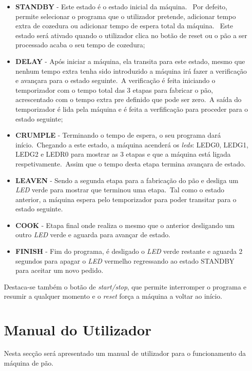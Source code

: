 \documentclass{article}
\begin{document}
    \begin{itemize}
        \label{finite-states}
        \item \textbf{STANDBY} - Este estado é o estado inicial da máquina. \ Por defeito, permite selecionar o programa que o utilizador pretende, adicionar tempo extra de cozedura ou adicionar tempo de espera total da máquina. \ Este estado será ativado quando o utilizador clica no botão de reset ou o pão a ser processado acaba o seu tempo de cozedura;
        \item \textbf{DELAY} - Após iniciar a máquina, ela transita para este estado, mesmo que nenhum tempo extra tenha sido introduzido a máquina irá fazer a verificação e avançara para o estado seguinte.\ A verificação é feita iniciando o temporizador com o tempo total das 3 etapas para fabricar o pão, acrescentado com o tempo extra pre definido que pode ser zero.\ A saída do temporizador é lida pela máquina e é feita a verfificação para proceder para o estado seguinte;
        \item \textbf{CRUMPLE} - Terminando o tempo de espera, o seu programa dará início.\ Chegando a este estado, a máquina acenderá os \textit{leds}: LEDG0, LEDG1, LEDG2 e LEDR0 para mostrar as 3 etapas e que a máquina está ligada respetivamente.\ Assim que o tempo desta etapa termina avançara de estado.
        \item \textbf{LEAVEN} - Sendo a  segunda etapa para a fabricação do pão e desliga um \textit{LED} verde para mostrar que terminou uma etapa.\ Tal como o estado anterior, a máquina espera pelo temporizador para poder transitar para o estado seguinte.
        \item \textbf{COOK} - Etapa final onde realiza o mesmo que o anterior desligando um outro \textit{LED} verde e aguarda para avançar de estado.
        \item \textbf{FINISH} - Fim do programa, é desligado o \textit{LED} verde restante e aguarda 2 segundos para apagar o \textit{LED} vermelho regressando ao estado STANDBY para aceitar um novo pedido.
    \end{itemize}

     Destaca-se também o botão de \textit{start/stop}, que permite interromper o programa e resumir a qualquer momento e o \textit{reset} força a máquina a voltar ao início.

    \newpage
    \section{Manual do Utilizador}\label{sec:manualUtilizador}
        Nesta secção será apresentado um manual de utilizador para o funcionamento da máquina de pão.
\end{document}
